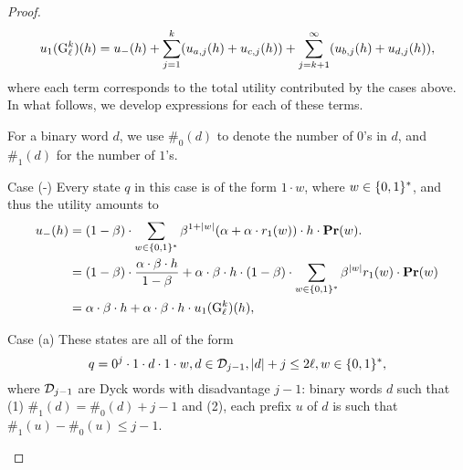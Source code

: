 \begin{proof}
$$u_1({\rm {G}}^k_\ell)(h) = u_{-}(h) + \sum_{j=1}^k (u_{a,j}(h) + u_{c,j}(h)) +
\sum_{j=k+1}^\infty (u_{b,j}(h) + u_{d,j}(h)),$$ where each term corresponds to
the total utility contributed by the cases above. In what follows, we develop
expressions for each of these terms.

For a binary word $d$, we use $\#_0(d)$ to denote the number of $0$'s in $d$, and $\#_1(d)$ for the number of $1$'s. 


\begin{subsubsection}{Case (-)} Every state $q$ in this case is of the form
    $1\cdot w$, where $w\in \{0,1\}^\ast$, and thus the utility amounts to
\begin{align*}
u_{-}(h) &= (1-\beta) \cdot \sum_{w\in \{0,1\}^\ast}\beta^{1+|w|} (\alpha + \alpha\cdot r_1(w))\cdot h \cdot \mathbf{Pr}(w).\\
    &= (1-\beta) \cdot\frac{\alpha\cdot \beta \cdot h}{1-\beta} + \alpha\cdot\beta\cdot h \cdot(1-\beta)\cdot\sum_{w\in \{0,1\}^\ast}\beta^{|w|} r_1(w) \cdot \mathbf{Pr}(w)\\
    &= \alpha\cdot \beta \cdot h + \alpha\cdot\beta\cdot h\cdot u_1({\rm {G}}^k_\ell)(h),
\end{align*}
\end{subsubsection}


\begin{subsubsection}{Case (a)}
These states are all of the form 
$$q = 0^j\cdot 1\cdot d\cdot 1\cdot w, d\in \mathcal{D}_{j-1}, |d|+j \leq 2\ell, w\in \{0,1\}^\ast,$$ 
where $\mathcal{D}_{j-1}$ are Dyck words with disadvantage $j-1$: binary words $d$ such that (1) $\#_1(d) = \#_0(d) + j-1$ and (2), each prefix $u$ of $d$ is such that 
$\#_1(u) - \#_0(u) \leq j-1$.

\begin{figure}[ht!]
\end{figure}
\end{subsubsection}
\end{proof}
